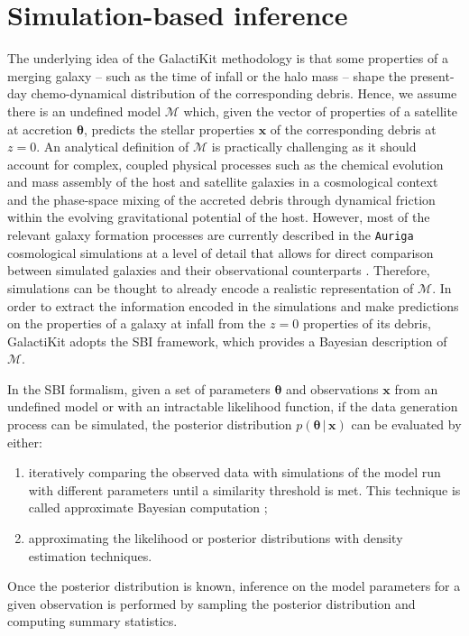 
\section{Simulation-based inference}
\label{sec:sbi}

The underlying idea of the GalactiKit methodology is that some properties of a merging galaxy -- such as the time of infall or the halo mass -- shape the  present-day chemo-dynamical distribution of the corresponding debris. Hence, we assume there is an undefined model $\mathcal{M}$ which, given the vector of properties of a satellite at accretion $\bm{\theta}$, predicts the stellar properties $\bm{x}$ of the corresponding debris at $z=0$. An analytical definition of $\mathcal{M}$ is practically challenging as it should account for complex, coupled physical processes such as the chemical evolution and mass assembly of the host and satellite galaxies in a cosmological context and the phase-space mixing of the accreted debris through dynamical friction within the evolving gravitational potential of the host. However, most of the relevant galaxy formation processes are currently described in the \texttt{Auriga} cosmological simulations at a level of detail that allows for direct comparison between simulated galaxies and their observational counterparts \citep{Monachesi2019}. Therefore, simulations can be thought to already encode a realistic representation of $\mathcal{M}$. In order to extract the information encoded in the simulations and make predictions on the properties of a galaxy at infall from the $z=0$ properties of its debris, GalactiKit adopts the SBI framework, which provides a Bayesian description of $\mathcal{M}$. 

In the SBI formalism, given a set of parameters $\bm{\theta}$ and observations $\bm{x}$ from an undefined model or with an intractable likelihood function, if the data generation process can be simulated, the posterior distribution $p(\bm{\theta} \, | \, \bm{x})$ can be evaluated by either: 

\begin{enumerate}
    \item iteratively comparing the observed data with simulations of the model run with different parameters until a similarity threshold is met. This technique is called approximate Bayesian computation \citep[ABC,][]{Rubin1984};
    \item approximating the likelihood or posterior distributions with density estimation techniques.
\end{enumerate}
Once the posterior distribution is known, inference on the model parameters for a given observation is performed by sampling the posterior distribution and computing summary statistics.

